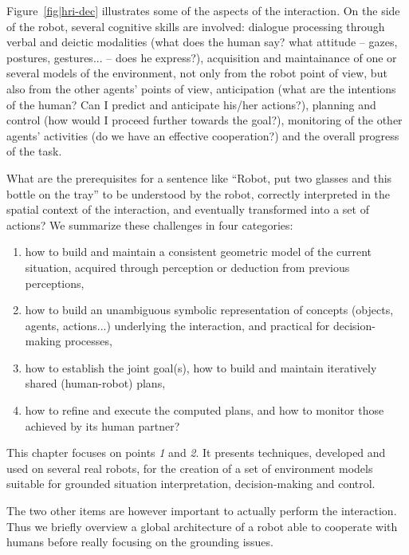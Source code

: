 \documentclass{svmult}
\begin{document}
Figure~\ref{fig|hri-dec} illustrates some of the aspects of the interaction.
On the side of the robot, several cognitive skills are involved: dialogue
processing through verbal and deictic modalities (what does the human say? what
attitude -- gazes, postures, gestures... -- does he express?), acquisition
and maintainance of one or several models of the environment, not only from the
robot point of view, but also from the other agents' points of view,
anticipation (what are the intentions of the human? Can I predict and
anticipate his/her actions?), planning and control (how would I proceed further
towards the goal?), monitoring of the other agents' activities (do we have an
effective cooperation?) and the overall progress of the task. 

What are the prerequisites for a sentence like ``Robot, put two glasses and
this bottle on the tray'' to be understood by the robot, correctly
interpreted in the spatial context of the interaction, and eventually
transformed into a set of actions? We summarize these challenges in four
categories:

\begin{enumerate}

	\item how to build and maintain a consistent geometric model of the current
	situation, acquired through perception or deduction from previous
	perceptions,

	\item how to build an unambiguous symbolic representation of concepts
	(objects, agents, actions...) underlying the interaction, and practical for
	decision-making processes,

	\item how to establish the joint goal(s), how to build and maintain
	iteratively shared (human-robot) plans, 

	\item how to refine and execute the computed plans, and how to monitor
	those achieved by its human partner?

\end{enumerate}


This chapter focuses on points {\it 1} and {\it 2}. It presents techniques,
developed and used on several real robots, for the creation of a set of
environment models suitable for grounded situation interpretation,
decision-making and control.

The two other items are however important to actually perform the interaction.
Thus we briefly overview a global architecture of a robot able to cooperate
with humans before really focusing on the grounding issues.
\end{document}
